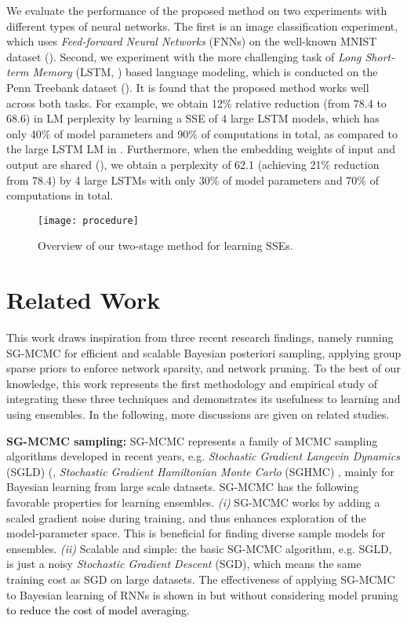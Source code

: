 \documentclass{article} %
\newcommand{\zyc}{\textcolor{black}}
\begin{document}
We evaluate the performance of the proposed method on two experiments with different types of neural networks. The first is an image classification experiment, which uses \textit{Feed-forward Neural Networks} (FNNs) on the well-known MNIST dataset (\citet{deng2012mnist}). 
Second, we experiment with the more challenging task of \textit{Long Short-term Memory} (LSTM, \citet{hochreiter1997long}) based language modeling, which is conducted on the Penn Treebank dataset (\citet{marcus1993building}).
It is found that the proposed method works well across both tasks. 
For example, we obtain 12\% relative reduction (from 78.4 to 68.6) in LM perplexity by learning a SSE of 4 large LSTM models, which has only 40\% of model parameters and 90\% of computations in total, as compared to the large LSTM LM in \citet{zaremba2014recurrent}. Furthermore, when the embedding weights of input and output are shared (\citet{inan2016tying, E17-2025}), we obtain a perplexity of 62.1 (achieving 21\% reduction from 78.4) by 4 large LSTMs with only 30\% of model parameters and 70\% of computations in total.

\begin{figure}[t]
	\begin{center}
		\texttt{[image: procedure]} 
	\end{center}
	\caption{Overview of our two-stage method for learning SSEs.}
	\label{procedure}
\end{figure}


\section{Related Work}
\label{re_work}

This work draws inspiration from three recent research findings, namely running SG-MCMC for efficient and scalable Bayesian posteriori sampling, applying group sparse priors to enforce network sparsity, and network pruning. To the best of our knowledge, this work represents the first methodology and empirical study of integrating these three techniques and demonstrates its usefulness to learning and using ensembles.
In the following, more discussions are given on related studies.

\textbf{SG-MCMC sampling:} 
SG-MCMC represents a family of MCMC sampling algorithms developed in recent years, e.g. \textit{Stochastic Gradient Langevin Dynamics} (SGLD) (\citet{welling2011bayesian}, \textit{Stochastic
	Gradient Hamiltonian Monte Carlo} (SGHMC) \citet{chen2014stochastic}, mainly for Bayesian learning from large scale datasets.
SG-MCMC has the following favorable properties for learning ensembles.
\textit{(i)} SG-MCMC works by adding a scaled gradient noise during training, and thus enhances exploration of the model-parameter space. This is beneficial for finding diverse sample models for ensembles.
\textit{(ii)} Scalable and simple: the basic SG-MCMC algorithm, e.g. SGLD, is just a noisy \textit{Stochastic Gradient Descent} (SGD), which means the same training cost as SGD on large datasets.
The effectiveness of applying SG-MCMC to Bayesian learning of RNNs is shown in \cite{gan2016scalable} but without considering model pruning \zyc{to reduce the cost of model averaging}. 
\end{document}
